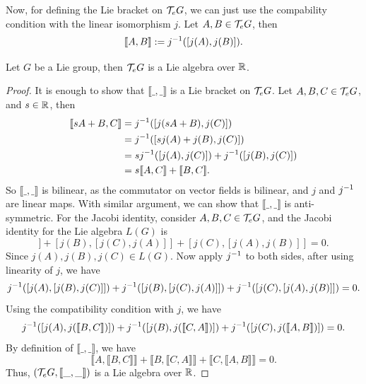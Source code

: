 Now, for defining the Lie bracket on \(\mathcal T_e G\), we can just use the compability condition with the linear isomorphism \(j\). Let \(A, B \in \mathcal T_e G\), then
\begin{equation*}
    \llbracket A, B \rrbracket := j^{-1}\qty([j(A), j(B)]).
\end{equation*}
\begin{proposition}
    Let \(G\) be a Lie group, then \(\mathcal T_e G\) is a Lie algebra over \(\mathbb R\).
\end{proposition}
\begin{proof}
    It is enough to show that \(\llbracket \_, \_ \rrbracket\) is a Lie bracket on \(\mathcal T_e G\). Let \(A, B, C \in \mathcal T_e G\), and \(s \in \mathbb R\), then
    \begin{align*}
        \llbracket s A + B, C \rrbracket & = j^{-1}\qty([j(s A + B), j(C)])                              \\
                                         & = j^{-1}\qty([s j(A) + j(B), j(C)])                           \\
                                         & = s j^{-1}\qty([j(A), j(C)]) + j^{-1}\qty([j(B), j(C)])        \\
                                         & = s \llbracket A, C \rrbracket + \llbracket B, C \rrbracket.
    \end{align*}
    So \(\llbracket \_, \_ \rrbracket\) is bilinear, as the commutator on vector fields is bilinear, and \(j\) and \(j^{-1}\) are linear maps. With similar argument, we can show that \(\llbracket \_, \_ \rrbracket\) is anti-symmetric. For the Jacobi identity, consider \(A, B, C \in \mathcal T_e G\), and the Jacobi identity for the Lie algebra \(L(G)\) is
    \begin{equation*}
        [j(A), [j(B), j(C)]] + [j(B), [j(C), j(A)]] + [j(C), [j(A), j(B)]] = 0.
    \end{equation*}
    Since \(j(A), j(B), j(C) \in L(G)\). Now apply \(j^{-1}\) to both sides, after using linearity of \(j\), we have
    \begin{equation*}
        j^{-1}\qty([j(A), [j(B), j(C)]]) + j^{-1}\qty([j(B), [j(C), j(A)]]) + j^{-1}\qty([j(C), [j(A), j(B)]]) = 0.
    \end{equation*}
    Using the compatibility condition with \(j\), we have
    \begin{equation*}
        j^{-1}\qty([j(A), j(\llbracket B, C \rrbracket)]) + j^{-1}\qty([j(B), j(\llbracket C, A \rrbracket)]) + j^{-1}\qty([j(C), j(\llbracket A, B \rrbracket)]) = 0.
    \end{equation*}
    By definition of \(\llbracket \_, \_ \rrbracket\), we have
    \begin{equation*}
        \llbracket A, \llbracket B, C \rrbracket \rrbracket + \llbracket B, \llbracket C, A \rrbracket \rrbracket + \llbracket C, \llbracket A, B \rrbracket \rrbracket = 0.
    \end{equation*}
    Thus, \((\mathcal T_e G, \llbracket \_, \_ \rrbracket)\) is a Lie algebra over \(\mathbb R\).
\end{proof}
